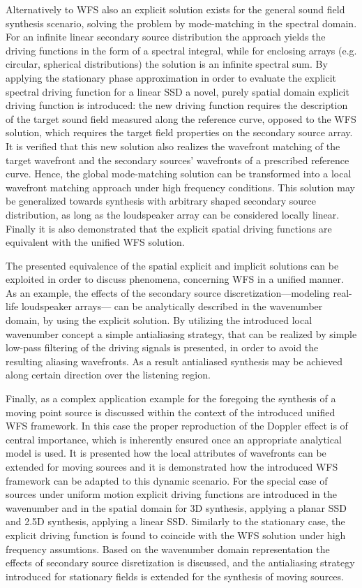 Alternatively to WFS also an explicit solution exists for the general sound field synthesis scenario, solving the problem by mode-matching in the spectral domain.
For an infinite linear secondary source distribution the approach yields the driving functions in the form of a spectral integral, while for enclosing arrays (e.g. circular, spherical distributions) the solution is an infinite spectral sum.
By applying the stationary phase approximation in order to evaluate the explicit spectral driving function for a linear SSD a novel, purely spatial domain explicit driving function is introduced: the new driving function requires the description of the target sound field measured along the reference curve, opposed to the WFS solution, which requires the target field properties on the secondary source array.
It is verified that this new solution also realizes the wavefront matching of the target wavefront and the secondary sources' wavefronts of a prescribed reference curve.
Hence, the global mode-matching solution can be transformed into a local wavefront matching approach under high frequency conditions.
This solution may be generalized towards synthesis with arbitrary shaped secondary source distribution, as long as the loudspeaker array can be considered locally linear.
Finally it is also demonstrated that the explicit spatial driving functions are equivalent with the unified WFS solution.

The presented equivalence of the spatial explicit and implicit solutions can be exploited in order to discuss phenomena, concerning WFS in a unified manner.
As an example, the effects of the secondary source discretization---modeling real-life loudspeaker arrays--- can be analytically described in the wavenumber domain, by using the explicit solution.
By utilizing the introduced local wavenumber concept a simple antialiasing strategy, that can be realized by simple low-pass filtering of the driving signals is presented, in order to avoid the resulting aliasing wavefronts.
As a result antialiased synthesis may be achieved along certain direction over the listening region.

Finally, as a complex application example for the foregoing the synthesis of a moving point source is discussed within the context of the introduced unified WFS framework.
In this case the proper reproduction of the Doppler effect is of central importance, which is inherently ensured once an appropriate analytical model is used.
It is presented how the local attributes of wavefronts can be extended for moving sources and it is demonstrated how the introduced WFS framework can be adapted to this dynamic scenario.
For the special case of sources under uniform motion explicit driving functions are introduced in the wavenumber and in the spatial domain for 3D synthesis, applying a planar SSD and 2.5D synthesis, applying a linear SSD.
Similarly to the stationary case, the explicit driving function is found to coincide with the WFS solution under high frequency assumtions.
Based on the wavenumber domain representation the effects of secondary source disretization is discussed, and the antialiasing strategy introduced for stationary fields is extended for the synthesis of moving sources.

